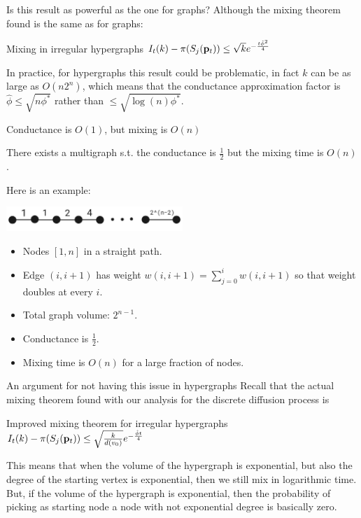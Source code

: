\documentclass[../main.tex]{subfiles}
\begin{document}
    \begin{frame}{Is this result as powerful as the one for graphs?} 
    	Although the mixing theorem found is the same as for graphs:
    	
		\begin{block}{Mixing in irregular hypergraphs}
			$I_t(k) - \pi(S_j(\bold{p}_{t})) \leq \sqrt{k} e^{-\frac{t\hat{\phi}^2}{4}}$
		\end{block}
	
		In practice, for hypergraphs this result could be problematic, in fact $k$ can be as large as $O(n2^n)$, which means that the conductance approximation factor is $\hat{\phi} \leq \sqrt{n\phi^*}$ rather than $\leq \sqrt{\log(n)\phi^*}$.    
	\end{frame}	

	\begin{frame}{Conductance is $O(1)$, but mixing is $O(n)$}
		\begin{lemma}
			There exists a multigraph s.t. the conductance is $\frac{1}{2}$ but the mixing time is $O(n)$.
		\end{lemma}
		Here is an example: \\ 
		\begin{center}
		\includegraphics[width=0.5\textwidth]{Figures/path_graph}
		\end{center}
		\begin{itemize}
			\item Nodes $[1,n]$ in a straight path.
			\item Edge $(i,i+1)$ has weight $w(i,i+1) = \sum_{j=0}^{i} w(i,i+1)$ so that weight doubles at every $i$.
			\item Total graph volume: $2^{n-1}$.
			\item Conductance is $\frac{1}{2}$.
			\item Mixing time is $O(n)$ for a large fraction of nodes.
		\end{itemize}
	\end{frame}

	\begin{frame}{An argument for not having this issue in hypergraphs}
		Recall that the actual mixing theorem found with our analysis for the discrete diffusion process is
		\begin{block}{Improved mixing theorem for irregular hypergraphs}
			$I_t(k) - \pi(S_j(\bold{p}_t)) \leq \sqrt{\frac{k}{d(v_0)}}e^{-\frac{\hat{\phi}t}{
			4}}$
		\end{block}
		This means that when the volume of the hypergraph is exponential, but also the degree of the starting vertex is exponential, then we still mix in logarithmic time. But, if the volume of the hypergraph is exponential, then the probability of picking as starting node a node with not exponential degree is basically zero.
	\end{frame}
\end{document}
